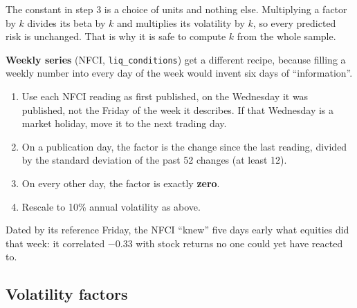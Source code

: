 \documentclass[11pt,a4paper]{article}
\newcommand{\fid}[1]{\texttt{#1}}
\begin{document}
\begin{tip}
The constant in step 3 is a choice of units and nothing else. Multiplying a factor by
$k$ divides its beta by $k$ and multiplies its volatility by $k$, so every predicted
risk is unchanged. That is why it is safe to compute $k$ from the whole sample.
\end{tip}

\textbf{Weekly series} (NFCI, \fid{liq\_conditions}) get a different recipe, because
filling a weekly number into every day of the week would invent six days of
``information''.

\begin{method}
\begin{enumerate}[leftmargin=1.4em]
  \item Use each NFCI reading as first published, on the Wednesday it was published, not the Friday of the week it describes. If that Wednesday is a market holiday, move it to the next trading day.
  \item On a publication day, the factor is the change since the last reading, divided by the standard deviation of the past 52 changes (at least 12).
  \item On every other day, the factor is exactly \textbf{zero}.
  \item Rescale to 10\% annual volatility as above.
\end{enumerate}
\end{method}

\begin{warn}
Dated by its reference Friday, the NFCI ``knew'' five days early what equities did
that week: it correlated $-0.33$ with stock returns no one could yet have reacted to.
\end{warn}

\subsection{Volatility factors}
\end{document}
